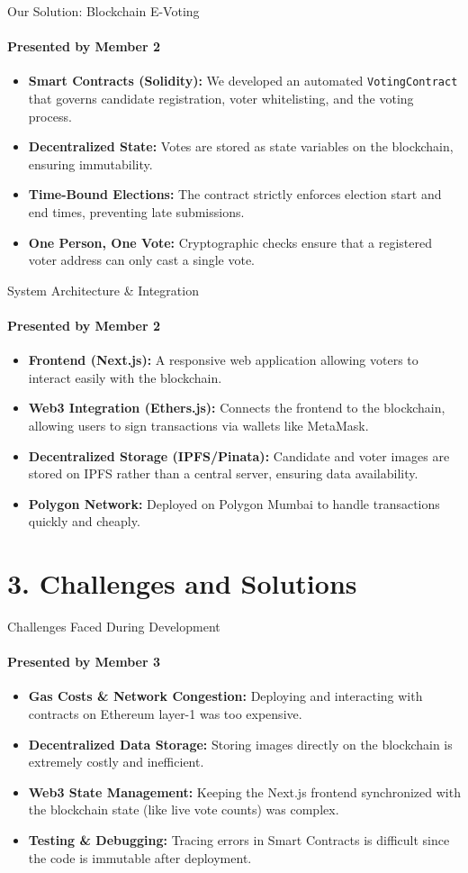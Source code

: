 \documentclass[aspectratio=169]{beamer}	%
\begin{document}
\begin{frame}{Our Solution: Blockchain E-Voting}
\framesubtitle{Presented by Member 2}
\begin{itemize}
    \item \textbf{Smart Contracts (Solidity):} We developed an automated \texttt{VotingContract} that governs candidate registration, voter whitelisting, and the voting process.
    \item \textbf{Decentralized State:} Votes are stored as state variables on the blockchain, ensuring immutability.
    \item \textbf{Time-Bound Elections:} The contract strictly enforces election start and end times, preventing late submissions.
    \item \textbf{One Person, One Vote:} Cryptographic checks ensure that a registered voter address can only cast a single vote.
\end{itemize}
\end{frame}

\begin{frame}{System Architecture \& Integration}
\framesubtitle{Presented by Member 2}
\begin{itemize}
    \item \textbf{Frontend (Next.js):} A responsive web application allowing voters to interact easily with the blockchain.
    \item \textbf{Web3 Integration (Ethers.js):} Connects the frontend to the blockchain, allowing users to sign transactions via wallets like MetaMask.
    \item \textbf{Decentralized Storage (IPFS/Pinata):} Candidate and voter images are stored on IPFS rather than a central server, ensuring data availability.
    \item \textbf{Polygon Network:} Deployed on Polygon Mumbai to handle transactions quickly and cheaply.
\end{itemize}
\end{frame}

\section{3. Challenges and Solutions}

\begin{frame}{Challenges Faced During Development}
\framesubtitle{Presented by Member 3}
\begin{itemize}
    \item \textbf{Gas Costs \& Network Congestion:} Deploying and interacting with contracts on Ethereum layer-1 was too expensive.
    \item \textbf{Decentralized Data Storage:} Storing images directly on the blockchain is extremely costly and inefficient.
    \item \textbf{Web3 State Management:} Keeping the Next.js frontend synchronized with the blockchain state (like live vote counts) was complex.
    \item \textbf{Testing \& Debugging:} Tracing errors in Smart Contracts is difficult since the code is immutable after deployment.
\end{itemize}
\end{frame}
\end{document}
